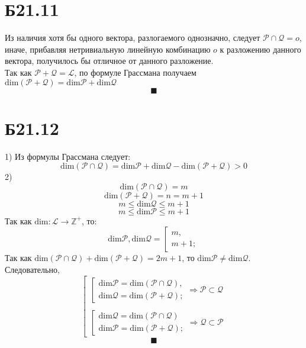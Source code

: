 \section*{Б21.11}
Из наличия хотя бы одного вектора, разлогаемого однозначно, следует $\mathcal{P}\cap\mathcal{Q}=o$, иначе, прибавляя нетривиальную линейную комбинацию $o$ к разложению данного вектора, получилось бы отличное от данного разложение.\\
Так как $\mathcal{P}+\mathcal{Q}=\mathcal{L}$, по формуле Грассмана получаем $\mathrm{dim}\left(\mathcal{P}+\mathcal{Q}\right)=\mathrm{dim}\mathcal{P}+\mathrm{dim}\mathcal{Q}$\\
$$\blacksquare$$
\section*{Б21.12}
1) Из формулы Грассмана следует:\\
$$\mathrm{dim}\left(\mathcal{P}\cap\mathcal{Q}\right)=\mathrm{dim}\mathcal{P}+\mathrm{dim}\mathcal{Q}-\mathrm{dim}\left(\mathcal{P}+\mathcal{Q}\right)>0$$
2) $$\mathrm{dim}\left(\mathcal{P}\cap\mathcal{Q}\right)=m$$
$$\mathrm{dim}\left(\mathcal{P}+\mathcal{Q}\right)=n=m+1$$
$$m\leq\mathrm{dim}\mathcal{Q}\leq m+1$$
$$m\leq\mathrm{dim}\mathcal{P}\leq m+1$$
Так как $\mathrm{dim}:\mathcal{L}\to\mathbb{Z}^{+}$, то:
$$\mathrm{dim}\mathcal{P}, \mathrm{dim}\mathcal{Q}=\left[\begin{matrix}
    m,\\
    m+1;
\end{matrix}\right.$$
Так как $\mathrm{dim}\left(\mathcal{P}\cap\mathcal{Q}\right)+\mathrm{dim}\left(\mathcal{P}+\mathcal{Q}\right)=2m+1$, то $\mathrm{dim}\mathcal{P}\neq\mathrm{dim}\mathcal{Q}$.
Следовательно,
$$\left[\begin{matrix}
    \left[\begin{matrix}
    \mathrm{dim}\mathcal{P}=\mathrm{dim}\left(\mathcal{P}\cap\mathcal{Q}\right),\\
    \mathrm{dim}\mathcal{Q}=\mathrm{dim}\left(\mathcal{P}+\mathcal{Q}\right);
\end{matrix}\right.\Rightarrow \mathcal{P}\subset\mathcal{Q}\\
\\
    \left[\begin{matrix}
    \mathrm{dim}\mathcal{Q}=\mathrm{dim}\left(\mathcal{P}\cap\mathcal{Q}\right)\\
    \mathrm{dim}\mathcal{P}=\mathrm{dim}\left(\mathcal{P}+\mathcal{Q}\right);
\end{matrix}\right.\Rightarrow \mathcal{Q}\subset\mathcal{P}
\end{matrix}\right.$$
$$\blacksquare$$

